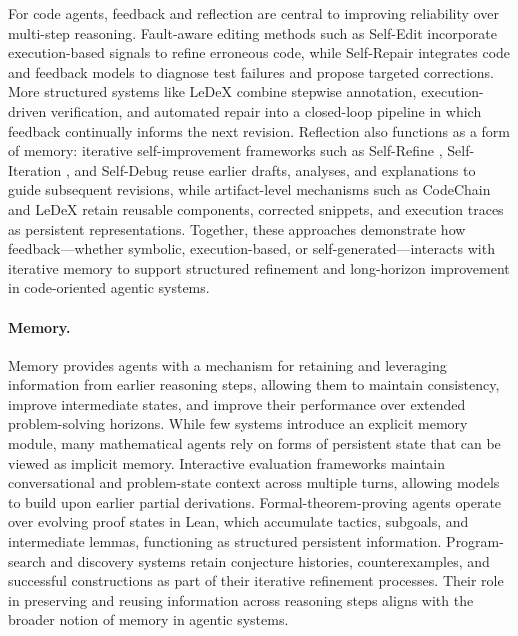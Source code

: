 For code agents, feedback and reflection are central to improving reliability over multi-step 
reasoning. Fault-aware editing methods such as Self-Edit \citep{zhang2023self} incorporate 
execution-based signals to refine erroneous code, while Self-Repair 
\citep{olausson2024selfrepairsilverbulletcode} integrates code and feedback models to diagnose test 
failures and propose targeted corrections. More structured systems like LeDeX \citep{jiang2024ledex} 
combine stepwise annotation, execution-driven verification, and automated repair into a closed-loop 
pipeline in which feedback continually informs the next revision. Reflection also functions as a 
form of memory: iterative self-improvement frameworks such as Self-Refine \citep{madaan2023self}, 
Self-Iteration \citep{chang2023self}, and Self-Debug \citep{chen2023teaching} reuse earlier drafts, 
analyses, and explanations to guide subsequent revisions, while artifact-level mechanisms such as 
CodeChain \citep{le2023codechain} and LeDeX \citep{jiang2024ledex} retain reusable components, 
corrected snippets, and execution traces as persistent representations. Together, these approaches 
demonstrate how feedback—whether symbolic, execution-based, or self-generated—interacts with 
iterative memory to support structured refinement and long-horizon improvement in code-oriented 
agentic systems.


\paragraph{Memory.}
Memory provides agents with a mechanism for retaining and leveraging information from earlier 
reasoning steps, allowing them to maintain consistency, improve intermediate states, and improve 
their performance over extended problem-solving horizons. While few systems introduce an explicit memory module, many mathematical agents rely on forms of persistent state that can be viewed as implicit memory. Interactive evaluation frameworks \citep{collins2024evaluating} maintain conversational and problem-state context across multiple turns, allowing models to build upon earlier partial derivations. Formal-theorem-proving agents \citep{thakur2024context} operate over evolving proof states in Lean, which accumulate tactics, subgoals, and intermediate lemmas, functioning as structured persistent information. Program-search and discovery systems \citep{romera2024mathematical,georgiev2025mathematical} retain conjecture histories, counterexamples, and successful constructions as part of their iterative refinement processes. Their role in preserving and reusing information across reasoning steps aligns with the broader notion of memory in agentic systems.



